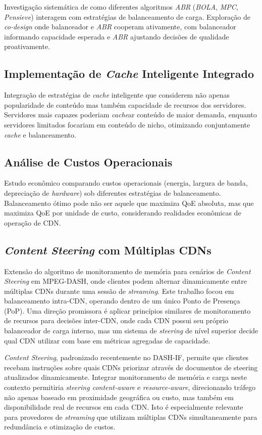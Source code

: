 Investigação sistemática de como diferentes algoritmos \textit{ABR} (\textit{BOLA}, \textit{MPC}, \textit{Pensieve}) interagem com estratégias de balanceamento de carga. Exploração de \textit{co-design} onde balanceador e \textit{ABR} cooperam ativamente, com balanceador informando capacidade esperada e \textit{ABR} ajustando decisões de qualidade proativamente.

\subsection{Implementação de \textit{Cache} Inteligente Integrado}

Integração de estratégias de \textit{cache} inteligente que considerem não apenas popularidade de conteúdo mas também capacidade de recursos dos servidores. Servidores mais capazes poderiam \textit{cache}ar conteúdo de maior demanda, enquanto servidores limitados focariam em conteúdo de nicho, otimizando conjuntamente \textit{cache} e balanceamento.

\subsection{Análise de Custos Operacionais}

Estudo econômico comparando custos operacionais (energia, largura de banda, depreciação de \textit{hardware}) sob diferentes estratégias de balanceamento. Balanceamento ótimo pode não ser aquele que maximiza QoE absoluta, mas que maximiza QoE por unidade de custo, considerando realidades econômicas de operação de CDN.

\subsection{\textit{Content Steering} com Múltiplas CDNs}

Extensão do algoritmo de monitoramento de memória para cenários de \textit{Content Steering} em MPEG-DASH, onde clientes podem alternar dinamicamente entre múltiplas CDNs durante uma sessão de \textit{streaming}. Este trabalho focou em balanceamento intra-CDN, operando dentro de um único Ponto de Presença (PoP). Uma direção promissora é aplicar princípios similares de monitoramento de recursos para decisões inter-CDN, onde cada CDN possui seu próprio balanceador de carga interno, mas um sistema de \textit{steering} de nível superior decide qual CDN utilizar com base em métricas agregadas de capacidade.

\textit{Content Steering}, padronizado recentemente no DASH-IF, permite que clientes recebam instruções sobre quais CDNs priorizar através de documentos de steering atualizados dinamicamente. Integrar monitoramento de memória e carga neste contexto permitiria \textit{steering content-aware} e \textit{resource-aware}, direcionando tráfego não apenas baseado em proximidade geográfica ou custo, mas também em disponibilidade real de recursos em cada CDN. Isto é especialmente relevante para provedores de \textit{streaming} que utilizam múltiplas CDNs simultaneamente para redundância e otimização de custos.

